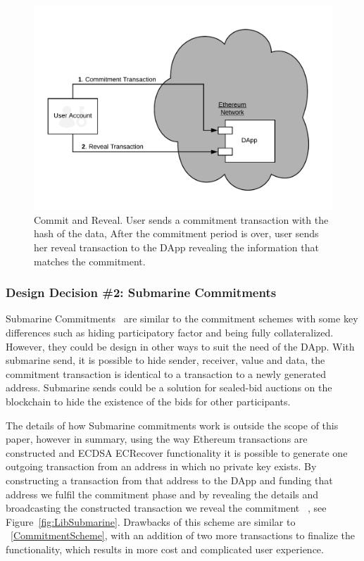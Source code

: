 \begin{figure}[h]
\centering
\includegraphics[width=0.5\linewidth]{figures/commit-reveal.png}
\caption{ Commit and Reveal. User sends a commitment transaction with the hash of the data, After the commitment period is over, user sends her reveal transaction to the DApp revealing the information that matches the commitment. \label{fig:commitReveal}}
\end{figure}

\subsubsection{Design Decision \#2: Submarine Commitments\newline}
Submarine Commitments~\cite{breidenbach2018enter, submarinesendHD} are similar to the commitment schemes with some key differences such as hiding participatory factor and being fully collateralized. However, they could be design in other ways to suit the need of the DApp. With submarine send, it is possible to hide sender, receiver, value and data, the commitment transaction is identical to a transaction to a newly generated address. Submarine sends could be a solution for sealed-bid auctions on the blockchain to hide the existence of the bids for other participants. 

The details of how Submarine commitments work is outside the scope of this paper, however in summary, using the way Ethereum transactions are constructed and ECDSA ECRecover functionality it is possible to generate one outgoing transaction from an address in which no private key exists. By constructing a transaction from that address to the DApp and funding that address we fulfil the commitment phase and by revealing the details and broadcasting the constructed transaction we reveal the commitment ~\cite{libsubmarine}, see Figure~\ref{fig:LibSubmarine}.  Drawbacks of this scheme are similar to ~\ref{CommitmentScheme}, with an addition of two more transactions to finalize the functionality, which results in more cost and complicated user experience.


